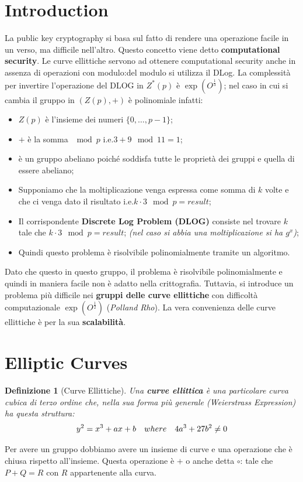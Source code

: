 \documentclass{book}
\newtheorem{Definizione}{\textbf{Definizione}}
\begin{document}
\section{Introduction}
La public key cryptography si basa sul fatto di rendere una operazione facile in un verso, ma difficile nell'altro. Questo concetto viene detto \textbf{computational security}\@.\newline
Le curve ellittiche servono ad ottenere computational security anche in assenza di operazioni con modulo:\@invece del modulo si utilizza il DLog. La complessità per invertire l'operazione del DLOG in \(Z^{*}(p)\) è \(\exp{(O^{\frac{1}{3}})}\); nel caso in cui si cambia il gruppo in \((Z(p),+)\) è polinomiale infatti:\begin{itemize}
	\item \(Z(p)\) è l'insieme dei numeri \( \{0,\ldots ,p-1 \} \);
	\item \(+\) è la somma \(\mod{p}\) i.e.\(3+9\mod{11}=1\);
	\item è un gruppo abeliano poiché soddisfa tutte le proprietà dei gruppi e quella di essere abeliano;
	\item Supponiamo che la moltiplicazione venga espressa come somma di \(k\) volte e che ci venga dato il risultato i.e.\(k\cdot 3\mod{p}=result\);
	\item Il corrispondente \textbf{Discrete Log Problem (DLOG)} consiste nel trovare \(k\) tale che \(k\cdot 3\mod{p}=result\); \emph{(nel caso si abbia una moltiplicazione si ha \(g^{x}\))};
	\item Quindi questo problema è risolvibile polinomialmente tramite un algoritmo.
\end{itemize}
Dato che questo in questo gruppo, il problema è risolvibile polinomialmente e quindi in maniera facile non è adatto nella crittografia. Tuttavia, si introduce un problema più difficile nei \textbf{gruppi delle curve ellittiche} con difficoltà computazionale \(\exp{(O^{\frac{1}{2}})}\) (\emph{Polland Rho}).
La vera convenienza delle curve ellittiche è per la sua \textbf{scalabilità}.
\section{Elliptic Curves}
\begin{Definizione}[Curve Ellittiche]
	Una \textbf{curve ellittica} è una particolare curva cubica di terzo ordine che, nella sua forma più generale (\emph{Weierstrass Expression}) ha questa struttura:\begin{equation*}
		\centering
		y^{2}=x^{3}+ax+b\quad where \quad 4a^{3}+27b^{2}\neq 0
	\end{equation*}
\end{Definizione}
Per avere un gruppo dobbiamo avere un insieme di curve e una operazione che è chiusa rispetto all'insieme. Questa operazione è \(+\) o anche detta \(\circ \): tale che \(P+Q=R\) con \(R\) appartenente alla curva.\newpage
\end{document}
